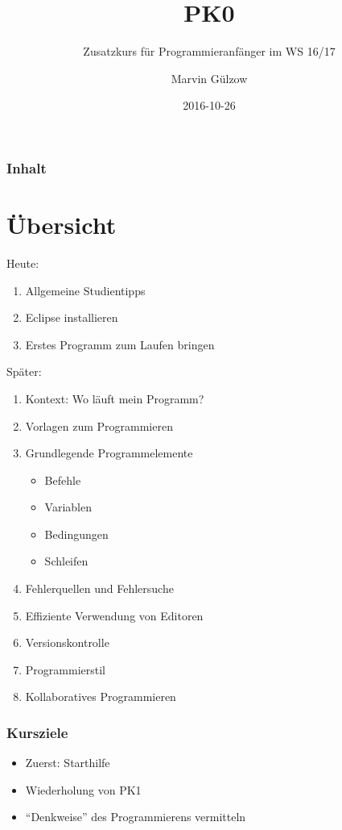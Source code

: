 \documentclass{beamer}
\title{PK0}
\subtitle{Zusatzkurs für Programmieranfänger im WS 16/17}
\author{Marvin Gülzow}
\institute{Universität Konstanz}
\date{2016-10-26}
\begin{document}
\frame{\maketitle}

\begin{frame}
\frametitle{Inhalt}
\tableofcontents
\end{frame}

\section{Übersicht}
\begin{frame}{\secname}
Heute: 
\begin{enumerate}
\item Allgemeine Studientipps
\item Eclipse installieren
\item Erstes Programm zum Laufen bringen
\end{enumerate}
\end{frame}

\begin{frame}{\secname}
Später: 
\begin{enumerate}
\item Kontext: Wo läuft mein Programm?
\item Vorlagen zum Programmieren
\item Grundlegende Programmelemente
	\begin{itemize}
	\item Befehle
	\item Variablen
	\item Bedingungen
	\item Schleifen
	\end{itemize}
\item Fehlerquellen und Fehlersuche
\item Effiziente Verwendung von Editoren
\item Versionskontrolle
\item Programmierstil
\item Kollaboratives Programmieren
\end{enumerate}
\end{frame}

\begin{frame}
\frametitle{Kursziele}
\begin{itemize}
\item Zuerst: Starthilfe
\item Wiederholung von PK1
\item ``Denkweise'' des Programmierens vermitteln
\end{itemize}
\end{frame}
\end{document}
